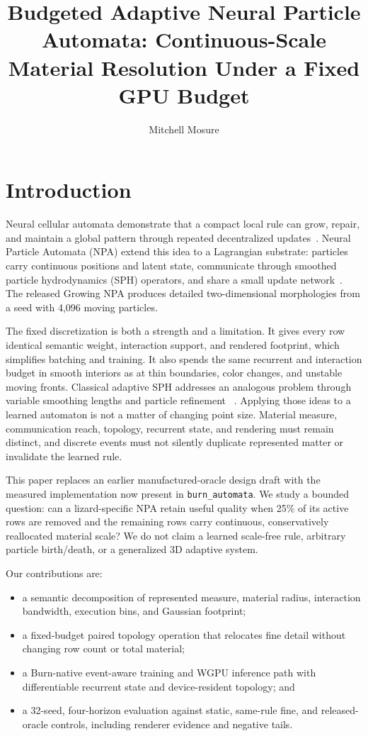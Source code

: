 \documentclass[sigconf,nonacm]{acmart}
\title{Budgeted Adaptive Neural Particle Automata:
Continuous-Scale Material Resolution Under a Fixed GPU Budget}
\author{Mitchell Mosure}
\affiliation{%
  \institution{Independent Research}
  \city{Chicago}
  \country{USA}
}
\begin{document}
\maketitle

\section{Introduction}

Neural cellular automata demonstrate that a compact local rule can grow,
repair, and maintain a global pattern through repeated decentralized
updates~\cite{mordvintsev2020growing}. Neural Particle Automata (NPA) extend
this idea to a Lagrangian substrate: particles carry continuous positions and
latent state, communicate through smoothed particle hydrodynamics (SPH)
operators, and share a small update network~\cite{kim2026npa}. The released
Growing NPA produces detailed two-dimensional morphologies from a seed with
4,096 moving particles.

The fixed discretization is both a strength and a limitation. It gives every
row identical semantic weight, interaction support, and rendered footprint,
which simplifies batching and training. It also spends the same recurrent and
interaction budget in smooth interiors as at thin boundaries, color changes,
and unstable moving fronts. Classical adaptive SPH addresses an analogous
problem through variable smoothing lengths and particle refinement
~\cite{price2012sph,muta2022efficient,nealon2024adaptive}. Applying those ideas
to a learned automaton is not a matter of changing point size. Material
measure, communication reach, topology, recurrent state, and rendering must
remain distinct, and discrete events must not silently duplicate represented
matter or invalidate the learned rule.

This paper replaces an earlier manufactured-oracle design draft with the
measured implementation now present in \texttt{burn\_automata}. We study a
bounded question: can a lizard-specific NPA retain useful quality when 25\%
of its active rows are removed and the remaining rows carry continuous,
conservatively reallocated material scale? We do not claim a learned
scale-free rule, arbitrary particle birth/death, or a generalized 3D adaptive
system.

Our contributions are:
\begin{itemize}
  \item a semantic decomposition of represented measure, material radius,
  interaction bandwidth, execution bins, and Gaussian footprint;
  \item a fixed-budget paired topology operation that relocates fine detail
  without changing row count or total material;
  \item a Burn-native event-aware training and WGPU inference path with
  differentiable recurrent state and device-resident topology; and
  \item a 32-seed, four-horizon evaluation against static, same-rule fine, and
  released-oracle controls, including renderer evidence and negative tails.
\end{itemize}
\end{document}
